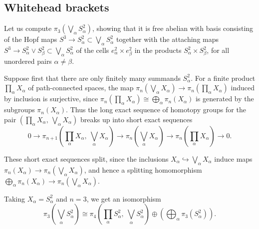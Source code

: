 \documentclass[12pt]{article}
\begin{document}
\subsection{Whitehead brackets}
\begin{example}
Let us compute
$\pi_3\!\left(\bigvee_\alpha S^2_\alpha\right)$,
showing that it is free abelian with basis consisting of the Hopf maps
$S^3 \to S^2_\alpha \subset \bigvee_\alpha S^2_\alpha$
together with the attaching maps
$S^3 \to S^2_\alpha \vee S^2_\beta \subset \bigvee_\alpha S^2_\alpha$
of the cells $e^2_\alpha \times e^2_\beta$ in the products
$S^2_\alpha \times S^2_\beta$, for all unordered pairs $\alpha \neq \beta$.

Suppose first that there are only finitely many summands $S^2_\alpha$. For a finite product
$\prod_\alpha X_\alpha$
of path-connected spaces, the map
$\pi_n\!\left(\bigvee_\alpha X_\alpha\right)\longrightarrow \pi_n\!\left(\prod_\alpha X_\alpha\right)$
induced by inclusion is surjective, since
$\pi_n\!\left(\prod_\alpha X_\alpha\right)\cong \bigoplus_\alpha \pi_n(X_\alpha)$
is generated by the subgroups $\pi_n(X_\alpha)$. Thus the long exact sequence of homotopy groups for the pair
$\left(\prod_\alpha X_\alpha,\ \bigvee_\alpha X_\alpha\right)$
breaks up into short exact sequences
\[
0 \longrightarrow \pi_{n+1}\!\left(\prod_\alpha X_\alpha,\ \bigvee_\alpha X_\alpha\right)
\longrightarrow \pi_n\!\left(\bigvee_\alpha X_\alpha\right)
\longrightarrow \pi_n\!\left(\prod_\alpha X_\alpha\right)
\longrightarrow 0.
\]

These short exact sequences split, since the inclusions
$X_\alpha \hookrightarrow \bigvee_\alpha X_\alpha$
induce maps
$\pi_n(X_\alpha)\to \pi_n\!\left(\bigvee_\alpha X_\alpha\right)$,
and hence a splitting homomorphism
$\bigoplus_\alpha \pi_n(X_\alpha)\to \pi_n\!\left(\bigvee_\alpha X_\alpha\right)$.

Taking $X_\alpha=S^2_\alpha$ and $n=3$, we get an isomorphism
\[
\pi_3\!\left(\bigvee_\alpha S^2_\alpha\right)
\cong
\pi_4\!\left(\prod_\alpha S^2_\alpha,\ \bigvee_\alpha S^2_\alpha\right)
\oplus
\left(\bigoplus_\alpha \pi_3(S^2_\alpha)\right).
\]


\end{example}
\end{document}
